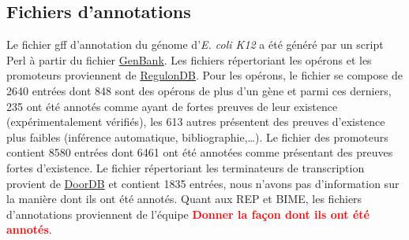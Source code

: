 \documentclass[12pt,a4paper]{report}
\begin{document}
\begin{onehalfspace}
\section*{Fichiers d'annotations}
Le fichier \gls{gff} d'annotation du génome d'\textit{E. coli K12} a été généré par un script Perl à partir du fichier \href{http://www.ncbi.nlm.nih.gov/nuccore/NC_000913.2}{GenBank}. Les fichiers répertoriant les opérons et les promoteurs proviennent de \href{http://regulondb.ccg.unam.mx/}{RegulonDB}. Pour les opérons, le fichier se compose de 2640 entrées dont 848 sont des opérons de plus d'un gène et parmi ces derniers, 235 ont été annotés comme ayant de fortes preuves de leur existence (expérimentalement vérifiés), les 613 autres présentent des preuves d'existence plus faibles (inférence automatique, bibliographie,\ldots). Le fichier des promoteurs contient 8580 entrées dont 6461 ont été annotées comme présentant des preuves fortes d'existence. Le fichier répertoriant les terminateurs de transcription provient de \href{http://csbl.bmb.uga.edu/DOOR/}{DoorDB} et contient 1835 entrées, nous n'avons pas d'information sur la manière dont ils ont été annotés. Quant aux REP et BIME, les fichiers d'annotations proviennent de l'équipe \textcolor{red}{\textbf{Donner la façon dont ils ont été annotés}}.


\end{onehalfspace}
\end{document}
